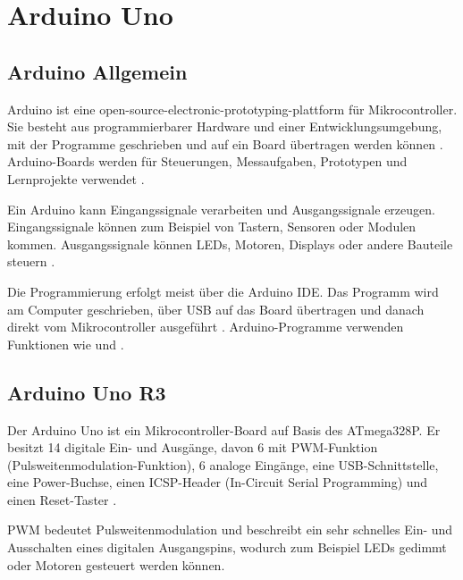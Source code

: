 %
%

\chapter{Arduino Uno}

\section{Arduino Allgemein}

Arduino ist eine open-source-electronic-prototyping-plattform für Mikrocontroller. Sie besteht aus programmierbarer Hardware und einer Entwicklungsumgebung, mit der Programme geschrieben und auf ein Board übertragen werden können \cite{arduino:language-reference}. Arduino-Boards werden für Steuerungen, Messaufgaben, Prototypen und Lernprojekte verwendet \cite{arduino:uno-r3}.

Ein Arduino kann Eingangssignale verarbeiten und Ausgangssignale erzeugen. Eingangssignale können zum Beispiel von Tastern, Sensoren oder Modulen kommen. Ausgangssignale können LEDs, Motoren, Displays oder andere Bauteile steuern \cite{arduino:uno-components}.

Die Programmierung erfolgt meist über die Arduino IDE. Das Programm wird am Computer geschrieben, über USB auf das Board übertragen und danach direkt vom Mikrocontroller ausgeführt \cite{arduino:uno-components}. Arduino-Programme verwenden Funktionen wie  und  \cite{arduino:language-reference}.

\section{Arduino Uno R3}

Der Arduino Uno ist ein Mikrocontroller-Board auf Basis des ATmega328P. Er besitzt 14 digitale Ein- und Ausgänge, davon 6 mit PWM-Funktion (Pulsweitenmodulation-Funktion), 6 analoge Eingänge, eine USB-Schnittstelle, eine Power-Buchse, einen ICSP-Header (In-Circuit Serial Programming) und einen Reset-Taster \cite{arduino:uno-r3}\cite{arduino:uno-datasheet}.

PWM bedeutet Pulsweitenmodulation und beschreibt ein sehr schnelles Ein- und Ausschalten eines digitalen Ausgangspins, wodurch zum Beispiel LEDs gedimmt oder Motoren gesteuert werden können.

